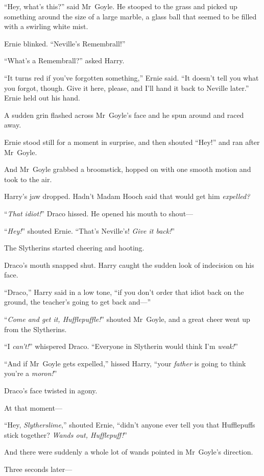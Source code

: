 “Hey, what’s this?” said Mr~Goyle. He stooped to the grass and picked up something around the size of a large marble, a glass ball that seemed to be filled with a swirling white mist.

Ernie blinked. “Neville’s Remembrall!”

“What’s a Remembrall?” asked Harry.

“It turns red if you’ve forgotten something,” Ernie said. “It doesn’t tell you what you forgot, though. Give it here, please, and I’ll hand it back to Neville later.” Ernie held out his hand.

A sudden grin flashed across Mr~Goyle’s face and he spun around and raced away.

Ernie stood still for a moment in surprise, and then shouted “Hey!” and ran after Mr~Goyle.

And Mr~Goyle grabbed a broomstick, hopped on with one smooth motion and took to the air.

Harry’s jaw dropped. Hadn’t Madam Hooch said that would get him \emph{expelled?}

“\emph{That idiot!}” Draco hissed. He opened his mouth to shout—

“\emph{Hey!}” shouted Ernie. “That’s Neville’s! \emph{Give it back!}”

The Slytherins started cheering and hooting.

Draco’s mouth snapped shut. Harry caught the sudden look of indecision on his face.

“Draco,” Harry said in a low tone, “if you don’t order that idiot back on the ground, the teacher’s going to get back and—”

“\emph{Come and get it, Hufflepuffle!}” shouted Mr~Goyle, and a great cheer went up from the Slytherins.

“I \emph{can’t!}” whispered Draco. “Everyone in Slytherin would think I’m \emph{weak!}”

“And if Mr~Goyle gets expelled,” hissed Harry, “your \emph{father} is going to think you’re a \emph{moron!}”

Draco’s face twisted in agony.

At that moment—

“Hey, \emph{Slytherslime},” shouted Ernie, “didn’t anyone ever tell you that Hufflepuffs stick together? \emph{Wands out, Hufflepuff!}”

And there were suddenly a whole lot of wands pointed in Mr~Goyle’s direction.

Three seconds later—


